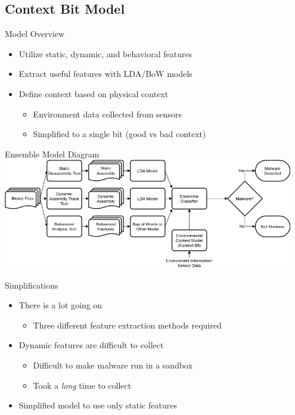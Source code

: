 \documentclass[handout,11pt]{beamer}
\begin{document}
	\subsection{Context Bit Model}
	\begin{frame}{Model Overview}
		\begin{itemize}
			\item Utilize static, dynamic, and behavioral features
			\item Extract useful features with LDA/BoW models
			\item Define context based on physical context
				\begin{itemize}
					\item Environment data collected from sensors
					\item Simplified to a single bit (good vs bad context)
				\end{itemize}
		\end{itemize}
	\end{frame}
	\begin{frame}{Ensemble Model Diagram}
		\centering
		\includegraphics[width=0.95\textwidth]{img/system_diagram_ensemble_context_bit.png}
	\end{frame}
	\begin{frame}{Simplifications}
		\begin{itemize}
			\item There is a lot going on
				\begin{itemize}
					\item Three different feature extraction methods required
				\end{itemize}
			\item Dynamic features are difficult to collect
				\begin{itemize}
					\item Difficult to make malware run in a sandbox
					\item Took a \textit{long} time to collect
				\end{itemize}
			\item Simplified model to use only static features
		\end{itemize}
	\end{frame}
\end{document}
